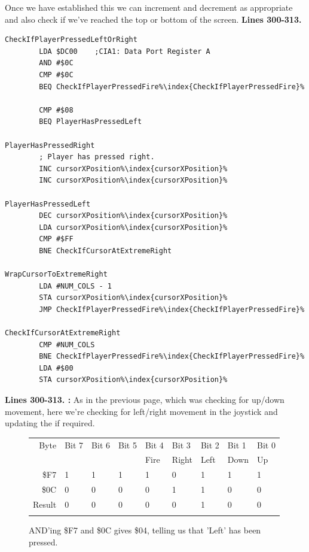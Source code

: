 Once we have established this we can increment and decrement  as appropriate and also check
if we've reached the top or bottom of the screen. 
\clearpage
\textbf{Lines 300-313. }
\begin{lstlisting}[caption= Second part of the Interrupt Handler.,escapechar=\%]
CheckIfPlayerPressedLeftOrRight   
        LDA $DC00    ;CIA1: Data Port Register A
        AND #$0C
        CMP #$0C
        BEQ CheckIfPlayerPressedFire%\index{CheckIfPlayerPressedFire}%

        CMP #$08
        BEQ PlayerHasPressedLeft

PlayerHasPressedRight
        ; Player has pressed right.
        INC cursorXPosition%\index{cursorXPosition}%
        INC cursorXPosition%\index{cursorXPosition}%

PlayerHasPressedLeft   
        DEC cursorXPosition%\index{cursorXPosition}%
        LDA cursorXPosition%\index{cursorXPosition}%
        CMP #$FF
        BNE CheckIfCursorAtExtremeRight

WrapCursorToExtremeRight
        LDA #NUM_COLS - 1
        STA cursorXPosition%\index{cursorXPosition}%
        JMP CheckIfPlayerPressedFire%\index{CheckIfPlayerPressedFire}%

CheckIfCursorAtExtremeRight   
        CMP #NUM_COLS
        BNE CheckIfPlayerPressedFire%\index{CheckIfPlayerPressedFire}%
        LDA #$00
        STA cursorXPosition%\index{cursorXPosition}%

\end{lstlisting}
\clearpage
{}
\textbf{Lines 300-313. :} As in the previous page, which was checking
for up/down movement, here we're checking for left/right movement in the joystick and updating the  if required.

\begin{figure}[H]
  {
    \setlength{\tabcolsep}{3.0pt}
    \setlength\cmidrulewidth{\heavyrulewidth} %
    \begin{adjustbox}{width=7cm,center}

      \begin{tabular}{rllllllll}
        \toprule
        Byte & Bit 7 & Bit 6 & Bit 5 & Bit 4 & Bit 3 & Bit 2 & Bit 1 & Bit 0        \\
             &       &       &       & Fire  & Right & Left  & Down  & Up           \\
        \midrule
        \$F7 & 1 & 1 & 1 & 1 & 0 & 1 & 1 & 1 \\
        \$0C & 0 & 0 & 0 & 0 & 1 & 1 & 0 & 0 \\
        \midrule
        Result & 0 & 0 & 0 & 0 & 0 & 1 & 0 & 0 \\
        \addlinespace
        \bottomrule
      \end{tabular}
    \end{adjustbox}
    }\caption*{AND'ing \$F7 and \$0C gives \$04, telling us that 'Left' has been pressed.}
\end{figure}

